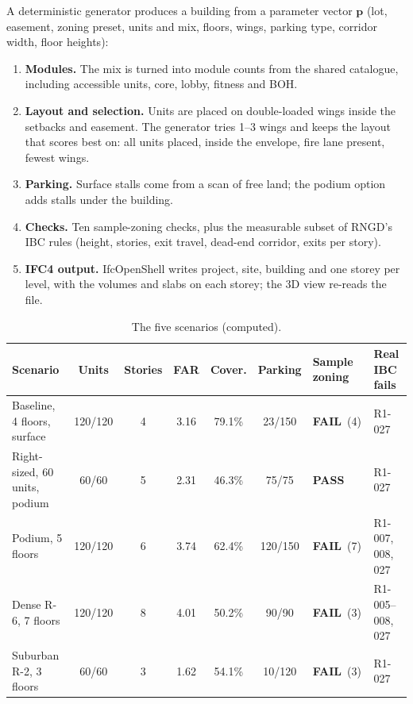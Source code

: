 \documentclass[10pt,a4paper]{article}
\newcommand{\PASS}{\textcolor{okc}{\textbf{PASS}}}
\newcommand{\FAIL}{\textcolor{failc}{\textbf{FAIL}}}
\theoremstyle{definition}
\begin{document}
A deterministic generator produces a building from a parameter vector $\mathbf{p}$ (lot, easement, zoning preset, units
and mix, floors, wings, parking type, corridor width, floor heights):
\begin{enumerate}
\item \textbf{Modules.} The mix is turned into module counts from the shared catalogue, including accessible units,
core, lobby, fitness and BOH.
\item \textbf{Layout and selection.} Units are placed on double-loaded wings inside the setbacks and easement. The
generator tries 1--3 wings and keeps the layout that scores best on: all units placed, inside the envelope, fire lane
present, fewest wings.
\item \textbf{Parking.} Surface stalls come from a scan of free land; the podium option adds stalls under the building.
\item \textbf{Checks.} Ten sample-zoning checks, plus the measurable subset of RNGD's IBC rules (height, stories, exit
travel, dead-end corridor, exits per story).
\item \textbf{IFC4 output.} IfcOpenShell writes project, site, building and one storey per level, with the volumes and
slabs on each storey; the 3D view re-reads the file.
\end{enumerate}

\begin{table}[H]
\centering\small
\caption{The five scenarios (computed).}
\label{tab:ifc}
\begin{tabular}{@{}l c c c c c l l@{}}
\toprule
\textbf{Scenario} & \textbf{Units} & \textbf{Stories} & \textbf{FAR} & \textbf{Cover.} & \textbf{Parking} & \textbf{Sample zoning} & \textbf{Real IBC fails} \\ \midrule
Baseline, 4 floors, surface & 120/120 & 4 & 3.16 & 79.1\% & 23/150 & \FAIL\ (4) & R1-027 \\
Right-sized, 60 units, podium & 60/60 & 5 & 2.31 & 46.3\% & 75/75 & \PASS & R1-027 \\
Podium, 5 floors & 120/120 & 6 & 3.74 & 62.4\% & 120/150 & \FAIL\ (7) & R1-007, 008, 027 \\
Dense R-6, 7 floors & 120/120 & 8 & 4.01 & 50.2\% & 90/90 & \FAIL\ (3) & R1-005--008, 027 \\
Suburban R-2, 3 floors & 60/60 & 3 & 1.62 & 54.1\% & 10/120 & \FAIL\ (3) & R1-027 \\
\bottomrule
\end{tabular}
\end{table}
\end{document}
